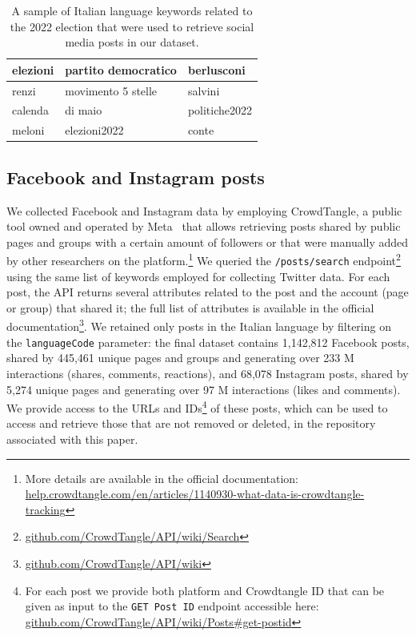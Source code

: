 \documentclass[letterpaper]{article} %
\begin{document}
\begin{table}[!t]
\centering
\begin{tabular}{lll}
elezioni & partito democratico & berlusconi \\ \hline
renzi & movimento 5 stelle & salvini \\ \hline
calenda & di maio & politiche2022 \\ \hline
meloni & elezioni2022 & conte  \\ \hline
\end{tabular}
\caption{A sample of Italian language keywords related to the 2022 election that were used to retrieve social media posts in our dataset.}
\label{tab:keywords}
\end{table}

\subsection{Facebook and Instagram posts}

We collected Facebook and Instagram data by employing CrowdTangle, a public tool owned and operated by Meta~\cite{crowdtangle} that allows retrieving posts shared by public pages and groups with a certain amount of followers or that were manually added by other researchers on the platform.\footnote{More details are available in the official documentation: \url{help.crowdtangle.com/en/articles/1140930-what-data-is-crowdtangle-tracking}} We queried the \texttt{/posts/search} endpoint\footnote{\url{github.com/CrowdTangle/API/wiki/Search}} using the same list of keywords employed for collecting Twitter data. For each post, the API returns several attributes related to the post and the account (page or group) that shared it; the full list of attributes is available in the official documentation\footnote{\url{github.com/CrowdTangle/API/wiki}}. We retained only posts in the Italian language by filtering on the \texttt{languageCode} parameter: the final dataset contains 1,142,812 Facebook posts, shared by 445,461 unique pages and groups and generating over 233 M interactions (shares, comments, reactions), and 68,078 Instagram posts, shared by 5,274 unique pages and generating over 97 M interactions (likes and comments). We provide access to the URLs and IDs\footnote{For each post we provide both platform and Crowdtangle ID that can be given as input to the \texttt{GET Post ID} endpoint accessible here: \url{github.com/CrowdTangle/API/wiki/Posts#get-postid}} of these posts, which can be used to access and retrieve those that are not removed or deleted, in the repository associated with this paper.
\end{document}
